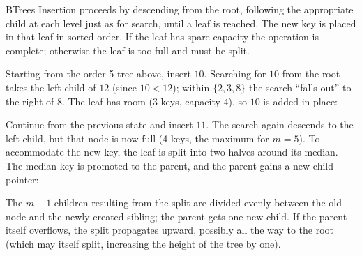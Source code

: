 \documentclass[hidelinks]{article}
\begin{document}
\begin{smodule}[title={B-Trees}]{BTrees}
Insertion proceeds by descending from the root, following the appropriate child at each level just as for search, until a leaf is reached. The new key is placed in that leaf in sorted order. If the leaf has spare capacity the operation is complete; otherwise the leaf is too full and must be split.

\begin{example}[Inserting $10$]
Starting from the order-5 tree above, insert $10$. Searching for $10$ from the root takes the left child of $12$ (since $10 < 12$); within $\{2,3,8\}$ the search ``falls out'' to the right of $8$. The leaf has room ($3$ keys, capacity $4$), so $10$ is added in place:
\begin{center}
\end{center}
\end{example}

\begin{example}
Continue from the previous state and insert $11$. The search again descends to the left child, but that node is now full (4 keys, the maximum for $m=5$). To accommodate the new key, the leaf is split into two halves around its median. The median key is promoted to the parent, and the parent gains a new child pointer:
\begin{center}
\end{center}
The $m+1$ children resulting from the split are divided evenly between the old node and the newly created sibling; the parent gets one new child. If the parent itself overflows, the split propagates upward, possibly all the way to the root (which may itself split, increasing the height of the tree by one).
\end{example}


\end{smodule}
\end{document}

